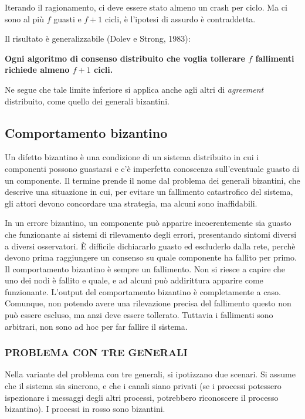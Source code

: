 Iterando il ragionamento, ci deve essere stato almeno un crash per ciclo. Ma ci sono al più $f$ guasti e $f+1$ cicli, è l'ipotesi di assurdo è contraddetta.

Il risultato è generalizzabile (Dolev e Strong, 1983):
\begin{center}
{\textbf{Ogni algoritmo di consenso distribuito che voglia tollerare $f$ fallimenti richiede almeno $f+1$ cicli.}}
\end{center}
\vspace{5mm}

Ne segue che tale limite inferiore si applica anche agli altri di \textit{agreement} distribuito, come quello dei generali bizantini.

\subsection{Comportamento bizantino}
Un difetto bizantino è una condizione di un sistema distribuito in cui i componenti possono guastarsi e c'è imperfetta conoscenza sull'eventuale guasto di un componente. Il termine prende il nome dal problema dei generali bizantini, che descrive una situazione in cui, per evitare un fallimento catastrofico del sistema, gli attori devono concordare una strategia, ma alcuni sono inaffidabili.

In un errore bizantino, un componente può apparire incoerentemente sia guasto che funzionante ai sistemi di rilevamento degli errori, presentando sintomi diversi a diversi osservatori. È difficile dichiararlo guasto ed escluderlo dalla rete, perchè devono prima raggiungere un consenso su quale componente ha fallito per primo. Il comportamento bizantino è sempre un fallimento. Non si riesce a capire che uno dei nodi è fallito e quale, e ad alcuni può addirittura apparire come funzionante. L'output del comportamento bizantino è completamente a caso. Comunque, non potendo avere una rilevazione precisa del fallimento questo non può essere escluso, ma anzi deve essere tollerato. Tuttavia i fallimenti sono arbitrari, non sono ad hoc per far fallire il sistema.
\subsubsection{PROBLEMA CON TRE GENERALI}
Nella variante del problema con tre generali, si ipotizzano due scenari. Si assume che il sistema sia sincrono, e che i canali siano privati (se i processi potessero ispezionare i messaggi degli altri processi, potrebbero riconoscere il processo bizantino). I processi in rosso sono bizantini.

